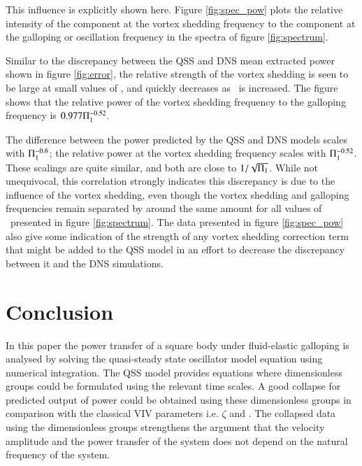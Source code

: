 This influence is explicitly shown here. Figure \ref{fig:spec_pow} plots the relative intensity of the component at the vortex shedding frequency to the component at the galloping or oscillation frequency in the spectra of figure \ref{fig:spectrum}.





Similar to the discrepancy between the QSS and DNS mean extracted power shown in figure \ref{fig:error}, the relative strength of the vortex shedding is seen to be large at small values of \massstiff, and quickly decreases as \massstiff\ is increased. The figure shows that the relative power of the vortex shedding frequency to the galloping frequency is $0.977\Pi_1^{-0.52}$.

The difference between the power predicted by the QSS and DNS models scales with $\Pi_1^{-0.6}$; the relative power at the vortex shedding frequency scales with $\Pi_1^{-0.52}$. These scalings are quite similar, and both are close to $1/\sqrt{\Pi_1}$. While not unequivocal, this correlation strongly indicates this discrepancy is due to the influence of the vortex shedding, even though the vortex shedding and galloping frequencies remain separated by around the same amount for all values of \massstiff\ presented in figure \ref{fig:spectrum}. The data presented in figure \ref{fig:spec_pow} also give some indication of the strength of any vortex shedding correction term that might be added to the QSS model in an effort to decrease the discrepancy between it and the DNS simulations.



\hspace{100cm}
 
\section{Conclusion}
\label{sec:conc}
In this paper the power transfer of a square body under fluid-elastic galloping is analysed by solving the quasi-steady state oscillator model equation using numerical  integration. The QSS model provides equations where dimensionless groups could be formulated using the relevant time scales. A good collapse for predicted output of power could be obtained using these dimensionless groups in comparison with the classical VIV parameters i.e. $\zeta$ and \ustar. The collapsed data using the dimensionless groups strengthens the argument that the velocity amplitude and the power transfer of the system does not depend on the natural frequency of the system. 
  
